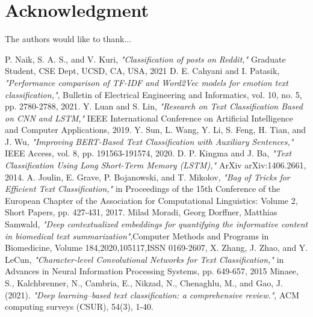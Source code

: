 \documentclass[conference]{IEEEtran}
\begin{document}
\section*{Acknowledgment}


The authors would like to thank...

\begin{thebibliography}{1}

P. Naik, S. A. S., and V. Kuri, \emph{"Classification of posts on Reddit,"} Graduate Student, CSE Dept, UCSD, CA, USA, 2021
D. E. Cahyani and I. Patasik, \emph{"Performance comparison of TF-IDF and Word2Vec models for emotion text classification,"}, Bulletin of Electrical Engineering and Informatics, vol. 10, no. 5, pp. 2780-2788, 2021.
Y. Luan and S. Lin, \emph{"Research on Text Classification Based on CNN and LSTM,"} IEEE International Conference on Artificial Intelligence and Computer Applications, 2019.
Y. Sun, L. Wang, Y. Li, S. Feng, H. Tian, and J. Wu, \emph{"Improving BERT-Based Text Classification with Auxiliary Sentences,"} IEEE Access, vol. 8, pp. 191563-191574, 2020.
D. P. Kingma and J. Ba, \emph{"Text Classification Using Long Short-Term Memory (LSTM),"} ArXiv arXiv:1406.2661, 2014.
A. Joulin, E. Grave, P. Bojanowski, and T. Mikolov, \emph{"Bag of Tricks for Efficient Text Classification,"} in Proceedings of the 15th Conference of the European Chapter of the Association for Computational Linguistics: Volume 2, Short Papers, pp. 427-431, 2017.
Milad Moradi, Georg Dorffner, Matthias Samwald,
\emph{"Deep contextualized embeddings for quantifying the informative content in biomedical text summarization"},Computer Methods and Programs in Biomedicine, Volume 184,2020,105117,ISSN 0169-2607,
X. Zhang, J. Zhao, and Y. LeCun, \emph{"Character-level Convolutional Networks for Text Classification,"} in Advances in Neural Information Processing Systems, pp. 649-657, 2015
Minaee, S., Kalchbrenner, N., Cambria, E., Nikzad, N., Chenaghlu, M., and  Gao, J. (2021). \emph{"Deep learning--based text classification: a comprehensive review."}, ACM computing surveys (CSUR), 54(3), 1-40.


\end{thebibliography}
\end{document}

